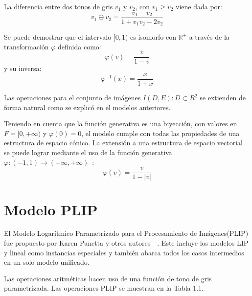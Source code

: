 La diferencia entre dos tonos de gris $v_1$ y $v_2$, con $v_1 \geq v_2$ viene dada por:
\begin{equation}
	v_1\ominus v_2=\frac{v_1-v_2}{1+v_1v_2-2v_2}
\end{equation}

Se puede demostrar que el intervalo $[0, 1)$ es isomorfo con $\mathbb{R}^+$ a través de la transformaci\'on $\varphi$ definida como:
\begin{equation}
	\varphi(v)=\frac{v}{1-v}
\end{equation}
y su inversa:
\begin{equation}
	\varphi^{-1}(x)=\frac{x}{1+x}
\end{equation}

Las operaciones para el conjunto de im\'agenes $I(D,E):D\subset R^2$ se extienden de forma natural como se explic\'o en el modelos anteriores.

Teniendo en cuenta que la función generativa es una biyección, con valores en $F = [ 0 , +\infty )$ y $\varphi(0)=0$, el modelo cumple con todas las propiedades de una estructura de espacio cónico. La extensión a una estructura de espacio vectorial se puede lograr mediante el uso de la función generativa $\varphi:(-1,1)\rightarrow (-\infty,+\infty)$~\cite{florea2009piecewise}:
\begin{equation}
	\varphi(v)=\frac{v}{1-|v|}
\end{equation}

\section{Modelo PLIP}

El Modelo Logar\'itmico Parametrizado para el Procesamiento de Im\'agenes(PLIP) fue propuesto por Karen Panetta y otros autores~\cite{panetta2007parameterization}~\cite{panetta2010parameterized}. Este incluye los modelos LIP y lineal como instancias especiales y también abarca todos los casos intermedios en un solo modelo unificado.

Las operaciones aritméticas hacen uso de una función de tono de gris parametrizada. Las operaciones PLIP se muestran en la Tabla 1.1.

